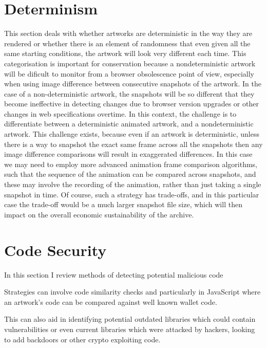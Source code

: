 \section{Determinism}

This section deals with whether artworks are deterministic in the way they are rendered or whether there is an element of randomness that even given all the same starting conditions, the artwork will look very different each time. This categorisation is important for conservation because a nondeterministic artwork will be dificult to monitor from a browser obsolescence point of view, especially when using image difference between consecutive snapshots of the artwork. In the case of a non-deterministic artwork, the snapshots will be so different that they become ineffective in detecting changes due to browser version upgrades or other changes in web specifications overtime. In this context, the challenge is to differentiate between a deterministic animated artwork, and a nondeterministic artwork. This challenge exists, because even if an artwork is deterministic, unless there is a way to snapshot the exact same frame across all the snapshots then any image difference comparisons will result in exaggerated differences. In this case we may need to employ more advanced animation frame comparison algorithms, such that the sequence of the animation can be compared across snapshots, and these may involve the recording of the animation, rather than just taking a single snapshot in time. Of course, such a strategy has trade-offs, and in this particular case the trade-off would be a much larger snapshot file size, which will then impact on the overall economic sustainability of the archive.


\section{Code Security}

In this section I review methods of detecting potential malicious code

Strategies can involve code similarity checks \cite{ragkhitwetsagulComparisonCodeSimilarity2018} and particularly in JavaScript \cite{alfagehCloneDetectionTechniques2020} where an artwork's code can be compared against well known wallet code.

This can also aid in identifying potential outdated libraries which could contain vulnerabilities or even current libraries which were attacked by hackers, looking to add backdoors or other crypto exploiting code.



